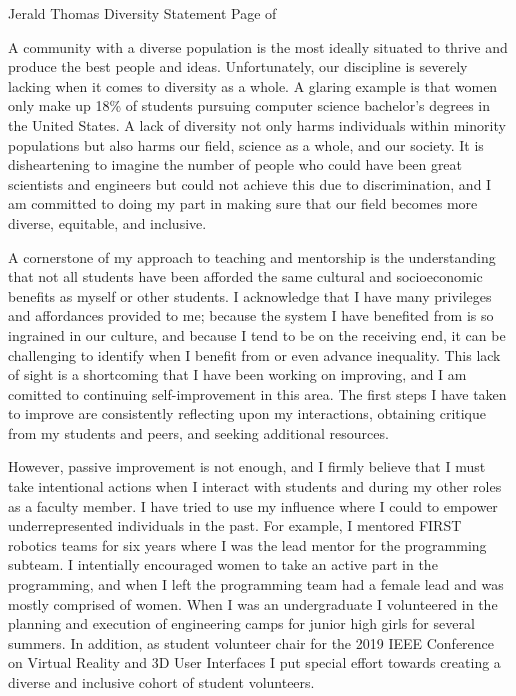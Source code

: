 \newpage

\setcounter{page}{1}
\makecvfooter
  {Jerald Thomas}
  {Diversity Statement}
  {Page \thepage \hspace{1pt} of \pageref{diversity_last}}

\makecvheader[C]


A community with a diverse population is the most ideally situated to thrive and produce the best people and ideas. Unfortunately, our discipline is severely lacking when it comes to diversity as a whole. A glaring example is that women only make up 18\% of students pursuing computer science bachelor's degrees in the United States. A lack of diversity not only harms individuals within minority populations but also harms our field, science as a whole, and our society. It is disheartening to imagine the number of people who could have been great scientists and engineers but could not achieve this due to discrimination, and I am committed to doing my part in making sure that our field becomes more diverse, equitable, and inclusive.

A cornerstone of my approach to teaching and mentorship is the understanding that not all students have been afforded the same cultural and socioeconomic benefits as myself or other students. I acknowledge that I have many privileges and affordances provided to me; because the system I have benefited from is so ingrained in our culture, and because I tend to be on the receiving end, it can be challenging to identify when I benefit from or even advance inequality. This lack of sight is a shortcoming that I have been working on improving, and I am comitted to continuing self-improvement in this area. The first steps I have taken to improve are consistently reflecting upon my interactions, obtaining critique from my students and peers, and seeking additional resources.

However, passive improvement is not enough, and I firmly believe that I must take intentional actions when I interact with students and during my other roles as a faculty member. I have tried to use my influence where I could to empower underrepresented individuals in the past. For example, I mentored FIRST robotics teams for six years where I was the lead mentor for the programming subteam. I intentially encouraged women to take an active part in the programming, and when I left the programming team had a female lead and was mostly comprised of women. When I was an undergraduate I volunteered in the planning and execution of engineering camps for junior high girls for several summers. In addition, as student volunteer chair for the 2019 IEEE Conference on Virtual Reality and 3D User Interfaces I put special effort towards creating a diverse and inclusive cohort of student volunteers. 

